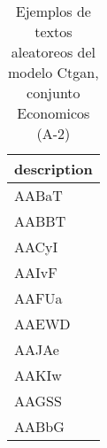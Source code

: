 \begin{table}[H]
\centering
\fontsize{8}{14}\selectfont
\caption{Ejemplos de textos aleatoreos del modelo Ctgan, conjunto Economicos (A-2)}
\label{table-sample10-economicos-a-2-ctgan-text}
\begin{tabular}{|m{50em}|}
\hline
\rowcolor[gray]{0.8}
description \\
\hline AABaT \\
\hline AABBT \\
\hline AACyI \\
\hline AAIvF \\
\hline AAFUa \\
\hline AAEWD \\
\hline AAJAe \\
\hline AAKIw \\
\hline AAGSS \\
\hline AABbG \\
\hline
\end{tabular}
\end{table}
